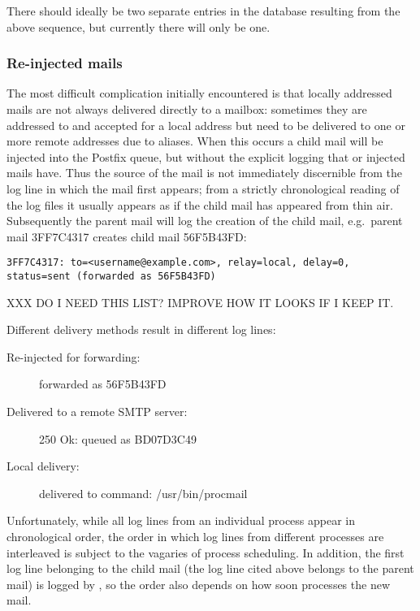 There should ideally be two separate entries in the database resulting from
the above sequence, but currently there will only be one.



\subsubsection{Re-injected mails}

\label{Re-injected mails}

The most difficult complication initially encountered is that locally
addressed mails are not always delivered directly to a mailbox: sometimes
they are addressed to and accepted for a local address but need to be
delivered to one or more remote addresses due to aliases.  When this
occurs a child mail will be injected into the Postfix queue, but without
the explicit logging that  or  injected
mails have.  Thus the source of the mail is not immediately discernible
from the log line in which the mail first appears; from a strictly
chronological reading of the log files it usually appears as if the child
mail has appeared from thin air.  Subsequently the parent mail will log the
creation of the child mail, e.g.\ parent mail 3FF7C4317 creates child mail
56F5B43FD\@:

\texttt{3FF7C4317: to=<username@example.com>, relay=local, \newline{}
\tab{} delay=0, status=sent (forwarded as 56F5B43FD)}

XXX DO I NEED THIS LIST\@? IMPROVE HOW IT LOOKS IF I KEEP IT\@.

Different delivery methods result in different log lines:

\begin{description}

    \item [Re-injected for forwarding:] forwarded as 56F5B43FD

    \item [Delivered to a remote \gls{SMTP} server:] 250 Ok: queued as
        BD07D3C49

    \item [Local delivery:] delivered to command: /usr/bin/procmail

\end{description}

Unfortunately, while all log lines from an individual process appear in
chronological order, the order in which log lines from different processes
are interleaved is subject to the vagaries of process scheduling.  In
addition, the first log line belonging to the child mail (the log line
cited above belongs to the parent mail) is logged by , so the
order also depends on how soon  processes the new mail.

